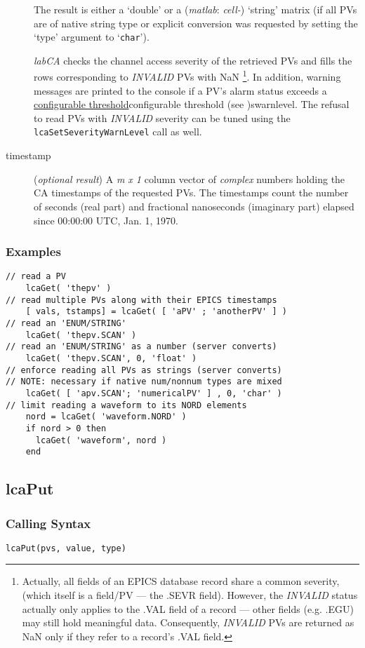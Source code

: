 \documentclass{article}
\newcommand{\sca}{\ita{labCA}}
\newcommand{\matlab}{\ita{matlab}}
\newcommand{\com}[1]{{\tt #1}}
\newcommand{\NAN}{\mbox{NaN}}
\newcommand{\pbrk}{\pagebreak[3]}
\newcommand{\ita}[1]{\emph{#1}}
\newcommand{\mxl}{$m\times 1$}
\renewcommand{\mxl}{\ita{m x 1}}
\renewcommand{\pbrk}{}
\begin{document}
\begin{description}
The result is either a `double' or a (\matlab: \ita{cell-}) `string'
matrix (if all PVs are of native string type or explicit conversion
was requested by setting the `type' argument to `\com{char}').

\sca{} checks the channel access severity of the retrieved PVs and
fills the rows corresponding to \ita{INVALID} PVs with \NAN%
\footnote{
Actually, all fields of an EPICS database record share a common
severity, (which itself is a field/PV --- the .SEVR field). However,
the \ita{INVALID} status actually only applies to the .VAL field
of a record --- other fields (e.g. .EGU) may still hold meaningful data.
Consequently, \ita{INVALID} PVs are returned as \NAN{} only if
they refer to a record's .VAL field.
}. In addition, warning
messages are printed to the console if a PV's alarm status exceeds
a \hyperref[ref]{configurable threshold}{configurable threshold (see }{ )}{swarnlevel}.
The refusal to read PVs with \ita{INVALID} severity can be tuned using
the \com{lcaSetSeverityWarnLevel} call as well.
%
%
\item[timestamp] (\ita{optional result}) A \mxl{}
column vector of \ita{complex} numbers holding the CA timestamps of
the requested PVs. The timestamps count the number of seconds (real part)
and fractional nanoseconds (imaginary part) elapsed since
00:00:00 UTC, Jan. 1, 1970.
\end{description}
\subsubsection{Examples}
\begin{verbatim}
// read a PV
    lcaGet( 'thepv' )
// read multiple PVs along with their EPICS timestamps
    [ vals, tstamps] = lcaGet( [ 'aPV' ; 'anotherPV' ] )
// read an 'ENUM/STRING'
    lcaGet( 'thepv.SCAN' )
// read an 'ENUM/STRING' as a number (server converts)
    lcaGet( 'thepv.SCAN', 0, 'float' )
// enforce reading all PVs as strings (server converts)
// NOTE: necessary if native num/nonnum types are mixed
    lcaGet( [ 'apv.SCAN'; 'numericalPV' ] , 0, 'char' )
// limit reading a waveform to its NORD elements
    nord = lcaGet( 'waveform.NORD' )
	if nord > 0 then
      lcaGet( 'waveform', nord )
	end
\end{verbatim}

\pbrk
\subsection{lcaPut}
\label{lcaput}
\subsubsection{Calling Syntax}
\begin{verbatim}
lcaPut(pvs, value, type)
\end{verbatim}
\end{document}

